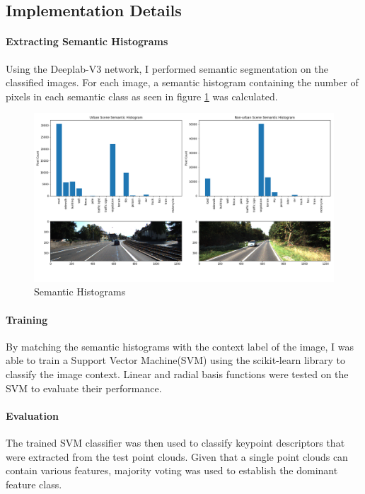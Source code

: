 \subsection*{Implementation Details}


\paragraph{Extracting Semantic Histograms} Using the Deeplab-V3 network, I performed semantic segmentation on the classified images. For each image, a semantic histogram containing the number of pixels in each semantic class as seen in figure \ref{fig:sem_hist} was calculated. 


\begin{figure}[h]%
	\centering
	\includegraphics[width=\linewidth]{images/semantic_hist.png}%
	\caption{Semantic Histograms}%
	\label{fig:sem_hist}%
\end{figure} 

\paragraph{Training}By matching the semantic histograms with the context label of the image, I was able to train a Support Vector Machine(SVM) using the scikit-learn library to classify the image context. Linear and radial basis functions were tested on the SVM to evaluate their performance.
\paragraph{Evaluation} The trained SVM classifier was then used to classify keypoint descriptors that were extracted from the test point clouds. Given that a single point clouds can contain various features, majority voting was used to establish the dominant feature class. 

